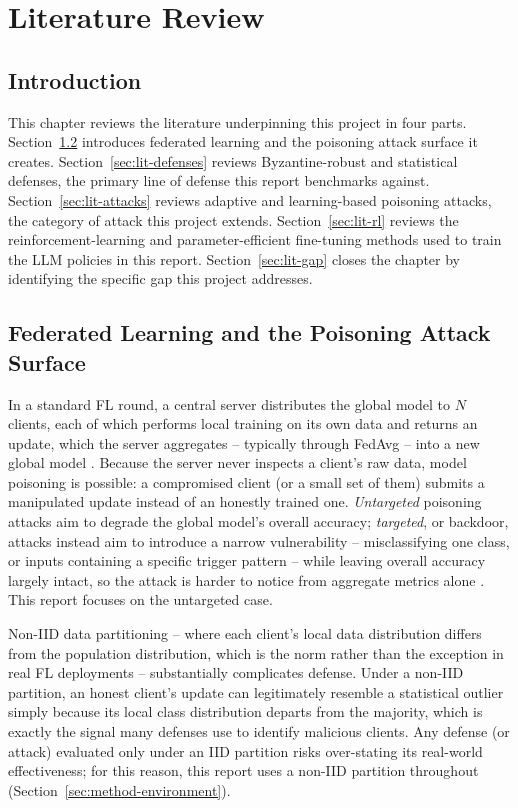 \chapter{Literature Review}
\label{ch:literature}

\section{Introduction}
\label{sec:lit-intro}

This chapter reviews the literature underpinning this project in four parts. Section~\ref{sec:lit-fl} introduces federated learning and the poisoning attack surface it creates. Section~\ref{sec:lit-defenses} reviews Byzantine-robust and statistical defenses, the primary line of defense this report benchmarks against. Section~\ref{sec:lit-attacks} reviews adaptive and learning-based poisoning attacks, the category of attack this project extends. Section~\ref{sec:lit-rl} reviews the reinforcement-learning and parameter-efficient fine-tuning methods used to train the LLM policies in this report. Section~\ref{sec:lit-gap} closes the chapter by identifying the specific gap this project addresses.

\section{Federated Learning and the Poisoning Attack Surface}
\label{sec:lit-fl}

In a standard FL round, a central server distributes the global model to $N$ clients, each of which performs local training on its own data and returns an update, which the server aggregates -- typically through FedAvg -- into a new global model \citep{fedavg}. Because the server never inspects a client's raw data, model poisoning is possible: a compromised client (or a small set of them) submits a manipulated update instead of an honestly trained one. \emph{Untargeted} poisoning attacks aim to degrade the global model's overall accuracy; \emph{targeted}, or backdoor, attacks instead aim to introduce a narrow vulnerability -- misclassifying one class, or inputs containing a specific trigger pattern -- while leaving overall accuracy largely intact, so the attack is harder to notice from aggregate metrics alone \citep{bagdasaryan2020}. This report focuses on the untargeted case.

Non-IID data partitioning -- where each client's local data distribution differs from the population distribution, which is the norm rather than the exception in real FL deployments -- substantially complicates defense. Under a non-IID partition, an honest client's update can legitimately resemble a statistical outlier simply because its local class distribution departs from the majority, which is exactly the signal many defenses use to identify malicious clients. Any defense (or attack) evaluated only under an IID partition risks over-stating its real-world effectiveness; for this reason, this report uses a non-IID partition throughout (Section~\ref{sec:method-environment}).

